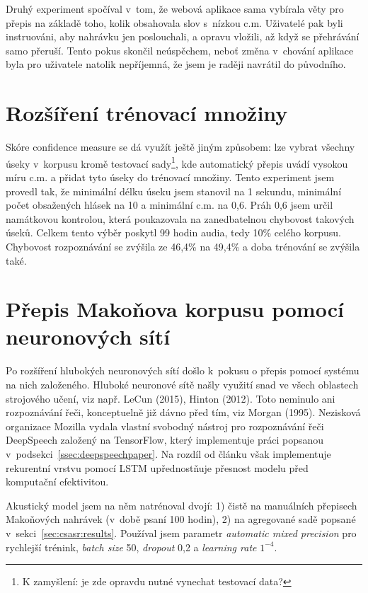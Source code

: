 Druhý experiment spočíval v~tom, že webová aplikace sama vybírala věty pro
přepis na základě toho, kolik obsahovala slov s~nízkou c.m. Uživatelé pak byli
instruováni, aby nahrávku jen poslouchali, a opravu vložili, až když se
přehrávání samo přeruší. Tento pokus skončil neúspěchem, neboť
změna v~chování aplikace byla pro uživatele natolik nepříjemná, že jsem je
raději navrátil do původního.

\section{Rozšíření trénovací množiny}
\label{sec:confident}

Skóre confidence measure se dá využít ještě jiným způsobem: lze vybrat všechny
úseky v~korpusu kromě testovací sady\footnote{K zamyšlení: je zde opravdu nutné
vynechat testovací data?}, kde automatický přepis uvádí vysokou míru
c.m. a přidat tyto úseky do trénovací množiny. Tento experiment jsem provedl
tak, že minimální délku úseku jsem stanovil na 1 sekundu, minimální počet
obsažených hlásek na 10 a minimální c.m. na 0,6. Práh 0,6 jsem určil namátkovou
kontrolou, která poukazovala na zanedbatelnou chybovost takových úseků. Celkem
tento výběr poskytl 99 hodin audia, tedy 10\% celého korpusu.
Chybovost rozpoznávání se zvýšila ze 46,4\% na 49,4\% a doba trénování
se zvýšila také.

\section{Přepis Makoňova korpusu pomocí neuronových sítí}
\label{sec:deepspeech}

Po rozšíření hlubokých neuronových sítí došlo k~pokusu o přepis pomocí systému
na nich založeného. 
Hluboké neuronové sítě našly využití
snad ve všech oblastech strojového učení, viz např. LeCun
(2015)\cite{lecun2015deep}, Hinton (2012)\cite{hinton2012deep}. Toto neminulo ani
rozpoznávání řeči, konceptuelně již dávno před tím, viz Morgan
(1995)\cite{morgan1995neural}.
Nezisková organizace Mozilla vydala vlastní svobodný nástroj pro rozpoznávání
řeči DeepSpeech\cite{hannun2014deep} založený na
TensorFlow\cite{abadi2016tensorflow}, který implementuje práci popsanou
v~podsekci~\ref{ssec:deepspeechpaper}.
Na rozdíl od článku\cite{hannun2014deep} však implementuje rekurentní vrstvu
pomocí LSTM upřednostňuje přesnost modelu před komputační efektivitou.

Akustický model jsem na něm natrénoval dvojí: 1) čistě na manuálních přepisech
Makoňových nahrávek (v~době psaní 100 hodin), 2) na agregované sadě popsané
v~sekci~\ref{sec:csasr:results}. Používal jsem parametr \textit{automatic mixed
precision} pro rychlejší trénink, \textit{batch size} 50, \textit{dropout} 0,2 a
\textit{learning rate} $1^{-4}$.

